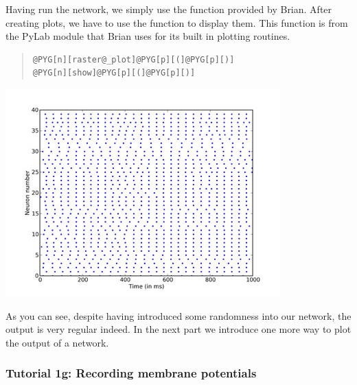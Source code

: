 \documentclass[letterpaper,10pt,english]{manual}
\begin{document}
Having run the network, we simply use the \hyperlink{brian.raster_plot}{} function
provided by Brian. After creating plots, we have to use the
 function to display them. This function is from the
PyLab module that Brian uses for its built in plotting
routines.
\begin{quote}

\begin{Verbatim}[commandchars=@\[\]]
@PYG[n][raster@_plot]@PYG[p][(]@PYG[p][)]
@PYG[n][show]@PYG[p][(]@PYG[p][)]
\end{Verbatim}
\end{quote}

\includegraphics{1f.jpg}

As you can see, despite having introduced some randomness into
our network, the output is very regular indeed. In the next part
we introduce one more way to plot the output of a network.

\resetcurrentobjects
\hypertarget{--doc-tutorial_1g_recording_membrane_potentials}{}

\subsubsection{Tutorial 1g: Recording membrane potentials}
\end{document}
